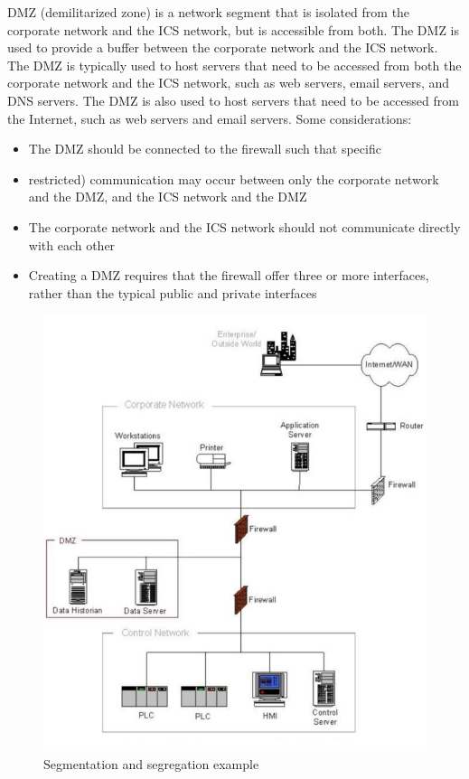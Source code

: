 \begin{paracol}{2}
   \colfill
   
   DMZ  (demilitarized zone) is a network segment that is isolated from the corporate
   network and the ICS network, but is accessible from both. The DMZ is used to
   provide a buffer between the corporate network and the ICS network. The DMZ
   is typically used to host servers that need to be accessed from both the corporate
   network and the ICS network, such as web servers, email servers, and DNS
   servers. The DMZ is also used to host servers that need to be accessed from
   the Internet, such as web servers and email servers. 
   Some considerations:
   \begin{itemize}
      \item The DMZ should be connected to the firewall such that specific
      \item restricted) communication may occur between only the corporate
   network and the DMZ, and the ICS network and the DMZ
      \item The corporate network and the ICS network should not
   communicate directly with each other
      \item Creating a DMZ requires that the firewall offer three or more
   interfaces, rather than the typical public and private interfaces
   \end{itemize}

   \colfill
   \switchcolumn

   \begin{figure}[htbp]
      \centering
      \includegraphics[width=0.90\columnwidth]{images/08/segmentation.png}
      \caption{Segmentation and segregation example}
      \label{fig:08/segmentation}
   \end{figure}
\end{paracol}

